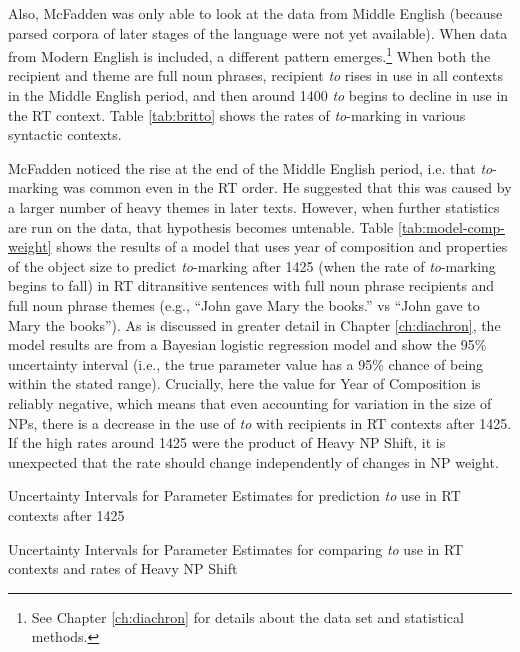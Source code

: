 		Also, McFadden was only able to look at the data from Middle English (because parsed corpora of later stages of the language were not yet available). When data from Modern English \citep{Kroch.2004,Kroch.2010,Taylor.2006} is included, a different pattern emerges.\footnote{See Chapter \ref{ch:diachron} for details about the data set and statistical methods.} When both the recipient and theme are full noun phrases, recipient \textit{to} rises in use in all contexts in the Middle English period, and then around 1400 \textit{to} begins to decline in use in the RT context. Table \ref{tab:britto} shows the rates of \textit{to}-marking in various syntactic contexts.



McFadden noticed the rise at the end of the Middle English period, i.e. that \textit{to}-marking was common even in the RT order. He suggested that this was caused by a larger number of heavy themes in later texts. However, when further statistics are run on the data, that hypothesis becomes untenable. Table \ref{tab:model-comp-weight} shows the results of a model that uses year of composition and properties of the object size to predict \textit{to}-marking after 1425 (when the rate of \textit{to}-marking begins to fall) in RT ditransitive sentences with full noun phrase recipients and full noun phrase themes (e.g., ``John gave Mary the books.'' vs ``John gave to Mary the books''). As is discussed in greater detail in Chapter \ref{ch:diachron}, the model results are from a Bayesian logistic regression model and show the 95\% uncertainty interval (i.e., the true parameter value has a 95\% chance of being within the stated range). Crucially, here the value for Year of Composition is reliably negative, which means that even accounting for variation in the size of NPs, there is a decrease in the use of \textit{to} with recipients in RT contexts after 1425. If the high rates around 1425 were the product of Heavy NP Shift, it is unexpected that the rate should change independently of changes in NP weight.

\begin{table}[ht!]
	\RawFloats
	
	\caption{Uncertainty Intervals for Parameter Estimates for prediction \textit{to} use in RT contexts after 1425}
	\label{tab:model-comp-weight}
	
	\caption{Uncertainty Intervals for Parameter Estimates for comparing \textit{to} use in RT contexts and rates of Heavy NP Shift}
	\label{tab:model-comp-heavy}
\end{table}

